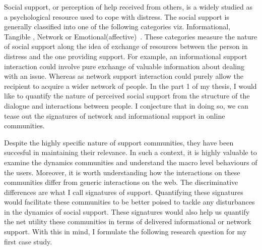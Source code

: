 Social support, or perception of help received from others, is a widely studied as a psychological resource used to cope with distress. The social support is generally classified into one of the following categories viz. Informational, Tangible , Network or Emotional(affective)~\cite{cutrona1992controllability}. These categories measure the nature of social support along the idea of exchange of resources between the person in distress and the one providing support. For example, an informational support interaction could involve pure exchange of valuable information about dealing with an issue. Whereas as network support interaction could purely allow the recipient to acquire a wider network of people.
In the part 1 of my thesis, I would like to quantify the nature of perceived social support from the structure of the dialogue and interactions between people. I conjecture that in doing so, we can tease out the signatures of network and informational support in online communities. 
 
Despite the highly specific nature of support communities, they have been succesful in maintaining their relevance. In such a context, it is highly valuable to examine the dynamics communities and understand the macro level behaviours of the users. Moreover, it is worth understanding how the interactions on these communities differ from generic interactions on the web. The discriminative differences are what I call signatures of support. Quantifying these signatures would facilitate these communities to be better poised to tackle any disturbances in the dynamics of social support. These signatures would also help us quantify the net utility these communities in terms of delivered informational or network support. With this in mind, I formulate the following research question for my first case study.

\noindent{}
\noindent{}
\noindent{}
\vspace{0.5cm}


